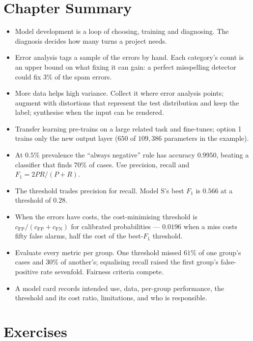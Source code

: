 \section*{Chapter Summary}

\begin{itemize}
  \item Model development is a loop of choosing, training and diagnosing. The
        diagnosis decides how many turns a project needs.
  \item Error analysis tags a sample of the errors by hand. Each category's count
        is an upper bound on what fixing it can gain: a perfect misspelling
        detector could fix $3\%$ of the spam errors.
  \item More data helps high variance. Collect it where error analysis points;
        augment with distortions that represent the test distribution and keep
        the label; synthesise when the input can be rendered.
  \item Transfer learning pre-trains on a large related task and fine-tunes;
        option 1 trains only the new output layer ($650$ of $109{,}386$
        parameters in the example).
  \item At $0.5\%$ prevalence the ``always negative'' rule has accuracy $0.9950$,
        beating a classifier that finds $70\%$ of cases. Use precision, recall
        and $F_1 = 2PR/(P+R)$.
  \item The threshold trades precision for recall. Model S's best $F_1$ is
        $0.566$ at a threshold of $0.28$.
  \item When the errors have costs, the cost-minimising threshold is
        $c_{\text{FP}}/(c_{\text{FP}} + c_{\text{FN}})$ for calibrated
        probabilities --- $0.0196$ when a miss costs fifty false alarms, half
        the cost of the best-$F_1$ threshold.
  \item Evaluate every metric per group. One threshold missed $61\%$ of one
        group's cases and $30\%$ of another's; equalising recall raised the
        first group's false-positive rate sevenfold. Fairness criteria compete.
  \item A model card records intended use, data, per-group performance, the
        threshold and its cost ratio, limitations, and who is responsible.
\end{itemize}

\section*{Exercises}

